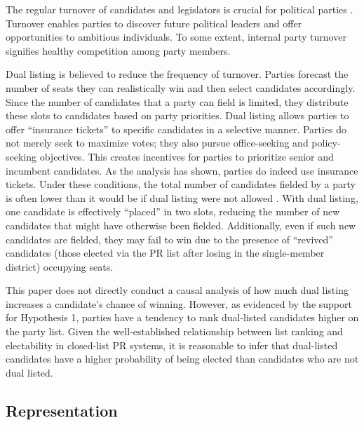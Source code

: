 \documentclass[a4paper, 11pt]{article}
\begin{document}
The regular turnover of candidates and legislators is crucial for political parties \citep{matlandDeterminantsLegislativeTurnover2004}. Turnover enables parties to discover future political leaders and offer opportunities to ambitious individuals. To some extent, internal party turnover signifies healthy competition among party members.

Dual listing is believed to reduce the frequency of turnover. Parties forecast the number of seats they can realistically win and then select candidates accordingly. Since the number of candidates that a party can field is limited, they distribute these slots to candidates based on party priorities. Dual listing allows parties to offer “insurance tickets” to specific candidates in a selective manner. Parties do not merely seek to maximize votes; they also pursue office-seeking and policy-seeking objectives. This creates incentives for parties to prioritize senior and incumbent candidates. As the analysis has shown, parties do indeed use insurance tickets. Under these conditions, the total number of candidates fielded by a party is often lower than it would be if dual listing were not allowed \citep[p.448]{mckeanJapansNewElectoral2000}. With dual listing, one candidate is effectively “placed” in two slots, reducing the number of new candidates that might have otherwise been fielded. Additionally, even if such new candidates are fielded, they may fail to win due to the presence of “revived” candidates (those elected via the PR list after losing in the single-member district) occupying seats.

This paper does not directly conduct a causal analysis of how much dual listing increases a candidate’s chance of winning. However, as evidenced by the support for Hypothesis 1, parties have a tendency to rank dual-listed candidates higher on the party list. Given the well-established relationship between list ranking and electability in closed-list PR systems, it is reasonable to infer that dual-listed candidates have a higher probability of being elected than candidates who are not dual listed.\footnotemark{} 


\subsection{Representation}
\end{document}
